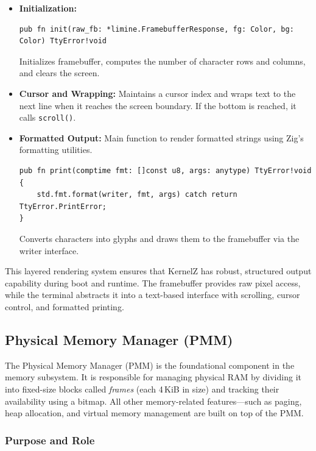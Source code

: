 \documentclass[12pt]{extarticle}
\begin{document}
\begin{itemize}
    \item \textbf{Initialization:}
    \begin{lstlisting}[language=zig, breaklines=true, basicstyle=\ttfamily\footnotesize]
pub fn init(raw_fb: *limine.FramebufferResponse, fg: Color, bg: Color) TtyError!void
    \end{lstlisting}
    Initializes framebuffer, computes the number of character rows and columns, and clears the screen.

    \item \textbf{Cursor and Wrapping:}  
    Maintains a cursor index and wraps text to the next line when it reaches the screen boundary. If the bottom is reached, it calls \texttt{scroll()}.

    \item \textbf{Formatted Output:}  
    Main function to render formatted strings using Zig’s formatting utilities.
    \begin{lstlisting}[language=zig, breaklines=true, basicstyle=\ttfamily\footnotesize]
pub fn print(comptime fmt: []const u8, args: anytype) TtyError!void {
    std.fmt.format(writer, fmt, args) catch return TtyError.PrintError;
}
    \end{lstlisting}
    Converts characters into glyphs and draws them to the framebuffer via the writer interface.
\end{itemize}

This layered rendering system ensures that KernelZ has robust, structured output capability during boot and runtime. The framebuffer provides raw pixel access, while the terminal abstracts it into a text-based interface with scrolling, cursor control, and formatted printing.
\pagebreak

\subsection{Physical Memory Manager (PMM)}

The Physical Memory Manager (PMM) is the foundational component in the memory subsystem. It is responsible for managing physical RAM by dividing it into fixed-size blocks called \textit{frames} (each 4\,KiB in size) and tracking their availability using a bitmap. All other memory-related features—such as paging, heap allocation, and virtual memory management are built on top of the PMM.

\subsubsection*{Purpose and Role}
\end{document}
